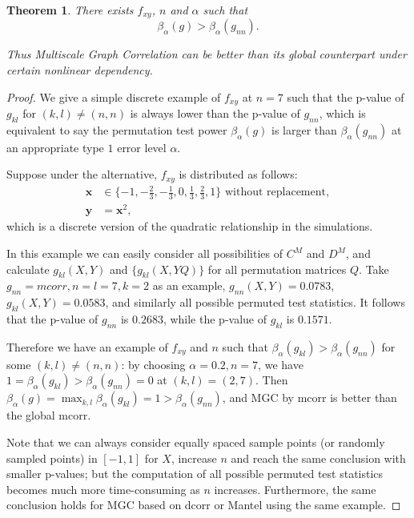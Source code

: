 \documentclass[11pt]{article}
\providecommand{\mb}[1]{\boldsymbol{#1}}
\newtheorem{thm}{Theorem}
\begin{document}
\begin{thm}
There exists $f_{xy}$, $n$ and $\alpha$ such that 
\begin{equation}
\beta_{\alpha}(g) > \beta_{\alpha}(g_{nn}).
\end{equation}

Thus Multiscale Graph Correlation can be better than its global counterpart under certain nonlinear dependency.
\end{thm}
\begin{proof}
We give a simple discrete example of $f_{xy}$ at $n=7$ such that the p-value of $g_{kl}$ for $(k,l) \neq (n,n)$ is always lower than the p-value of $g_{nn}$, which is equivalent to say the permutation test power $\beta_{\alpha}(g)$ is larger than $\beta_{\alpha}(g_{nn})$ at an appropriate type $1$ error level $\alpha$.

Suppose under the alternative, $f_{xy}$ is distributed as follows:
\begin{align*} 
\mb{x} &\in \{-1,-\frac{2}{3},-\frac{1}{3},0,\frac{1}{3},\frac{2}{3},1\} \mbox{ without replacement}, \\
\mb{y} &= \mb{x}^2,
\end{align*}
which is a discrete version of the quadratic relationship in the simulations.

In this example we can easily consider all possibilities of $C^{M}$ and $D^{M}$, and calculate $g_{kl}(X, Y)$ and $\{g_{kl}(X, YQ)\}$ for all permutation matrices $Q$. Take $g_{nn}=mcorr, n=l=7, k=2$ as an example, $g_{nn}(X, Y)=0.0783$, $g_{kl}(X, Y)=0.0583$, and similarly all possible permuted test statistics. It follows that the p-value of $g_{nn}$ is $0.2683$, while the p-value of $g_{kl}$ is $0.1571$. 

Therefore we have an example of $f_{xy}$ and $n$ such that $\beta_{\alpha}(g_{kl}) > \beta_{\alpha}(g_{nn})$ for some $(k,l) \neq (n,n)$: by choosing $\alpha=0.2, n=7$, we have $1=\beta_{\alpha}(g_{kl}) > \beta_{\alpha}(g_{nn})=0$ at $(k,l)=(2,7)$. Then $\beta_{\alpha}(g)=\max_{k,l}{\beta_{\alpha}(g_{kl})}=1>\beta_{\alpha}(g_{nn})$, and MGC by mcorr is better than the global mcorr.

Note that we can always consider equally spaced sample points (or randomly sampled points) in $[-1,1]$ for $X$, increase $n$ and reach the same conclusion with smaller p-values; but the computation of all possible permuted test statistics becomes much more time-consuming as $n$ increases. Furthermore, the same conclusion holds for MGC based on dcorr or Mantel using the same example.
\end{proof}




\end{document}
